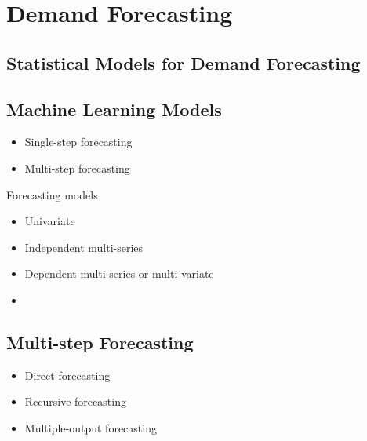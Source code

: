 \chapter{Demand Forecasting}
\label{ch:demand_forecasting}


\section{Statistical Models for Demand Forecasting}
\label{sec:statistical_models}



\section{Machine Learning Models}
\label{sec:machine_learning_models}

\begin{itemize}
    \item Single-step forecasting
    \item Multi-step forecasting
\end{itemize}

Forecasting models
\begin{itemize}
    \item Univariate
    \item Independent multi-series
    \item Dependent multi-series or multi-variate
    \item
\end{itemize}

\section{Multi-step Forecasting}
\label{sec:multi_step_forecasting}
%
\begin{itemize}
    \item Direct forecasting
    \item Recursive forecasting
    \item Multiple-output forecasting
\end{itemize}






